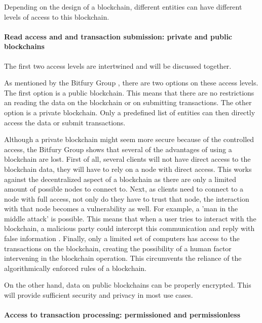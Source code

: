 Depending on the design of a blockchain, different entities can have different levels of access to this blockchain.

\paragraph{Read access and and transaction submission: private and public blockchains}

The first two access levels are intertwined and will be discussed together.

As mentioned by the Bitfury Group \cite{bitfury-permissioned}, there are two options on these access levels. The first option is a public blockchain. This means that there are no restrictions an reading the data on the blockchain or on submitting transactions. The other option is a private blockchain. Only a predefined list of entities can then directly access the data or submit transactions.

Although a private blockchain might seem more secure because of the controlled access, the Bitfury Group \cite{bitfury-permissioned} shows that several of the advantages of using a blockchain are lost. First of all, several clients will not have direct access to the blockchain data, they will have to rely on a node with direct access. This works against the decentralized aspect of a blockchain as there are only a limited amount of possible nodes to connect to. Next, as clients need to connect to a node with full access, not only do they have to trust that node, the interaction with that node becomes a vulnerability as well. For example, a 'man in the middle attack' is possible. This means that when a user tries to interact with the blockchain, a malicious party could intercept this communication and reply with false information \cite{man-in-the-middle}. Finally, only a limited set of computers has access to the transactions on the blockchain, creating the possibility of a human factor intervening in the blockchain operation. This circumvents the reliance of the algorithmically enforced rules of a blockchain.

On the other hand, data on public blockchains can be properly encrypted. This will provide sufficient security and privacy in most use cases.

\paragraph{Access to transaction processing: permissioned and permissionless}

